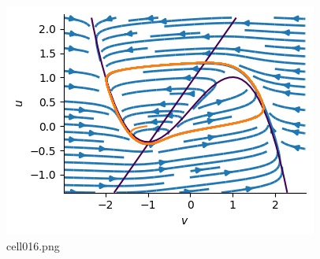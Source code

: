\begin{figure}[ht]
	\centering
	\includegraphics[scale=0.8, max width=\linewidth]{./fig/neuron-model/fhn/cell016.png}
	\caption{cell016.png}
	\label{cell016.png}
\end{figure}